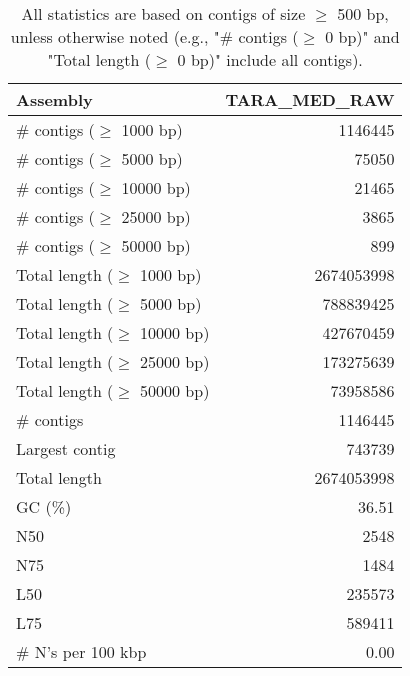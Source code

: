 \documentclass[12pt,a4paper]{article}
\begin{document}
\begin{table}[ht]
\begin{center}
\caption{All statistics are based on contigs of size $\geq$ 500 bp, unless otherwise noted (e.g., "\# contigs ($\geq$ 0 bp)" and "Total length ($\geq$ 0 bp)" include all contigs).}
\begin{tabular}{|l*{1}{|r}|}
\hline
Assembly & TARA\_MED\_RAW \\ \hline
\# contigs ($\geq$ 1000 bp) & 1146445 \\ \hline
\# contigs ($\geq$ 5000 bp) & 75050 \\ \hline
\# contigs ($\geq$ 10000 bp) & 21465 \\ \hline
\# contigs ($\geq$ 25000 bp) & 3865 \\ \hline
\# contigs ($\geq$ 50000 bp) & 899 \\ \hline
Total length ($\geq$ 1000 bp) & 2674053998 \\ \hline
Total length ($\geq$ 5000 bp) & 788839425 \\ \hline
Total length ($\geq$ 10000 bp) & 427670459 \\ \hline
Total length ($\geq$ 25000 bp) & 173275639 \\ \hline
Total length ($\geq$ 50000 bp) & 73958586 \\ \hline
\# contigs & 1146445 \\ \hline
Largest contig & 743739 \\ \hline
Total length & 2674053998 \\ \hline
GC (\%) & 36.51 \\ \hline
N50 & 2548 \\ \hline
N75 & 1484 \\ \hline
L50 & 235573 \\ \hline
L75 & 589411 \\ \hline
\# N's per 100 kbp & 0.00 \\ \hline
\end{tabular}
\end{center}
\end{table}
\end{document}
